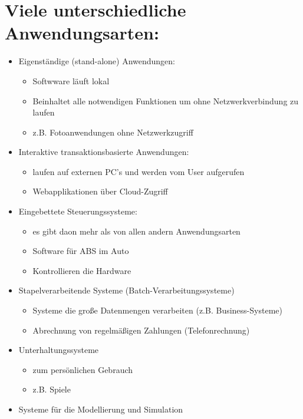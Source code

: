 \section{Viele unterschiedliche Anwendungsarten:}
\begin{itemize}
    \item Eigenständige (stand-alone) Anwendungen:
    \begin{itemize}
        \item Softwware läuft lokal
        \item Beinhaltet alle notwendigen Funktionen um ohne Netzwerkverbindung zu laufen
        \item z.B. Fotoanwendungen ohne Netzwerkzugriff
    \end{itemize}
    \item Interaktive transaktionsbasierte Anwendungen:
    \begin{itemize}
        \item laufen auf externen PC's und werden vom User aufgerufen
        \item Webapplikationen über Cloud-Zugriff
    \end{itemize}
    \item Eingebettete Steuerungssysteme:
    \begin{itemize}
        \item es gibt daon mehr als von allen andern Anwendungsarten
        \item Software für ABS im Auto
        \item Kontrollieren die Hardware
    \end{itemize}
    \item Stapelverarbeitende Systeme (Batch-Verarbeitungssysteme)
    \begin{itemize}
        \item Systeme die große Datenmengen verarbeiten (z.B. Business-Systeme)
        \item Abrechnung von regelmäßigen Zahlungen (Telefonrechnung)
    \end{itemize}
    \item Unterhaltungssysteme
    \begin{itemize}
        \item zum persönlichen Gebrauch
        \item z.B. Spiele
    \end{itemize}
    \item Systeme für die Modellierung und Simulation
    \begin{itemize}

\end{itemize}
\end{itemize}

